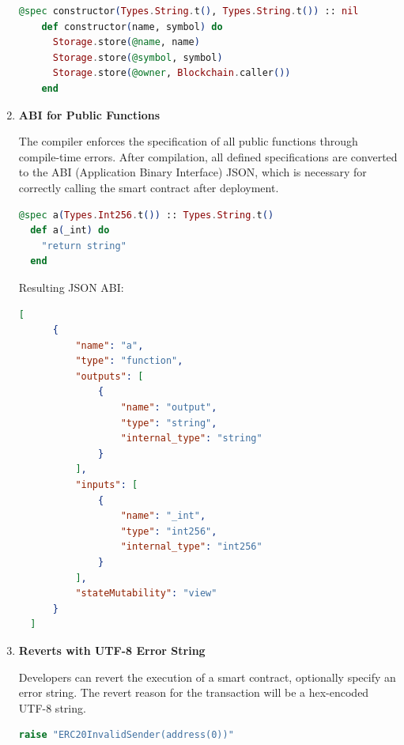 \begin{enumerate}
  \begin{lstlisting}[caption={Constructor}, language=elixir, label={lst:calldata_decoding_recursive}]
    @spec constructor(Types.String.t(), Types.String.t()) :: nil
    def constructor(name, symbol) do
      Storage.store(@name, name)
      Storage.store(@symbol, symbol)
      Storage.store(@owner, Blockchain.caller())
    end
  \end{lstlisting}
  
  \item \textbf{ABI for Public Functions}
  
  The compiler enforces the specification of all public functions through compile-time errors. After compilation, all defined specifications are converted to the ABI (Application Binary Interface) JSON, which is necessary for correctly calling the smart contract after deployment.

  \begin{lstlisting}[caption={@spec}, language=elixir, label={lst:calldata_decoding_recursive}]
  @spec a(Types.Int256.t()) :: Types.String.t()
  def a(_int) do
    "return string"
  end
  \end{lstlisting}
  
  Resulting JSON ABI:
  \begin{lstlisting}[caption={ABI }, language=json, label={lst:calldata_decoding_recursive}]
    [
      {
          "name": "a",
          "type": "function",
          "outputs": [
              {
                  "name": "output",
                  "type": "string",
                  "internal_type": "string"
              }
          ],
          "inputs": [
              {
                  "name": "_int",
                  "type": "int256",
                  "internal_type": "int256"
              }
          ],
          "stateMutability": "view"
      }
  ]
  \end{lstlisting}
  
  \item \textbf{Reverts with UTF-8 Error String}

  Developers can revert the execution of a smart contract, optionally specify an error string. The revert reason for the transaction will be a hex-encoded UTF-8 string.

  \begin{lstlisting}[caption={Reverts}, language=elixir, label={lst:calldata_decoding_recursive}]
    raise "ERC20InvalidSender(address(0))"
  \end{lstlisting}
\end{enumerate}

